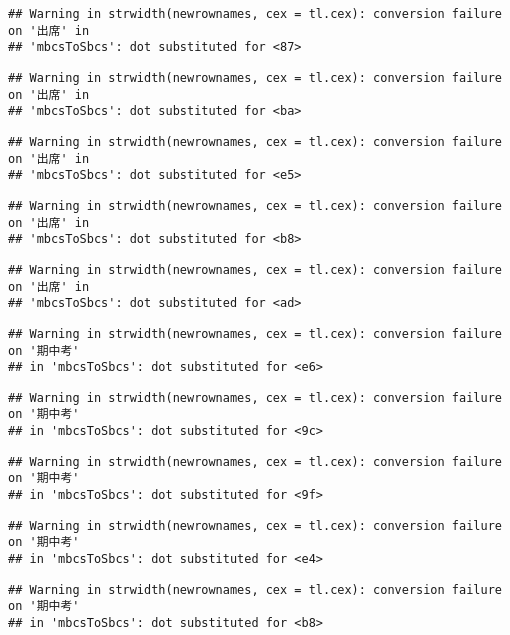 \documentclass[
]{book}
\begin{document}
\begin{verbatim}
## Warning in strwidth(newrownames, cex = tl.cex): conversion failure on '出席' in
## 'mbcsToSbcs': dot substituted for <87>
\end{verbatim}

\begin{verbatim}
## Warning in strwidth(newrownames, cex = tl.cex): conversion failure on '出席' in
## 'mbcsToSbcs': dot substituted for <ba>
\end{verbatim}

\begin{verbatim}
## Warning in strwidth(newrownames, cex = tl.cex): conversion failure on '出席' in
## 'mbcsToSbcs': dot substituted for <e5>
\end{verbatim}

\begin{verbatim}
## Warning in strwidth(newrownames, cex = tl.cex): conversion failure on '出席' in
## 'mbcsToSbcs': dot substituted for <b8>
\end{verbatim}

\begin{verbatim}
## Warning in strwidth(newrownames, cex = tl.cex): conversion failure on '出席' in
## 'mbcsToSbcs': dot substituted for <ad>
\end{verbatim}

\begin{verbatim}
## Warning in strwidth(newrownames, cex = tl.cex): conversion failure on '期中考'
## in 'mbcsToSbcs': dot substituted for <e6>
\end{verbatim}

\begin{verbatim}
## Warning in strwidth(newrownames, cex = tl.cex): conversion failure on '期中考'
## in 'mbcsToSbcs': dot substituted for <9c>
\end{verbatim}

\begin{verbatim}
## Warning in strwidth(newrownames, cex = tl.cex): conversion failure on '期中考'
## in 'mbcsToSbcs': dot substituted for <9f>
\end{verbatim}

\begin{verbatim}
## Warning in strwidth(newrownames, cex = tl.cex): conversion failure on '期中考'
## in 'mbcsToSbcs': dot substituted for <e4>
\end{verbatim}

\begin{verbatim}
## Warning in strwidth(newrownames, cex = tl.cex): conversion failure on '期中考'
## in 'mbcsToSbcs': dot substituted for <b8>
\end{verbatim}
\end{document}
